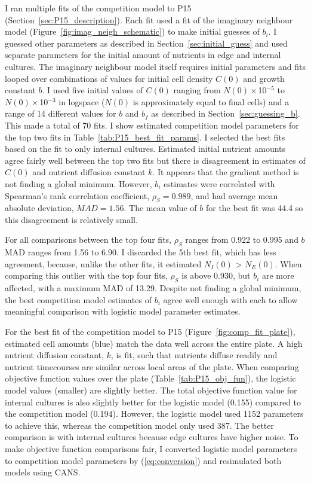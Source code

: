 I ran multiple fits of the competition model to P15
(Section~\ref{sec:P15_description}). Each fit used a fit of the
imaginary neighbour model (Figure~\ref{fig:imag_neigh_schematic}) to
make initial guesses of \(b_{i}\). I guessed other parameters as
described in Section~\ref{sec:initial_guess} and used separate
parameters for the initial amount of nutrients in edge and internal
cultures. The imaginary neighbour model itself requires initial
parameters and fits looped over combinations of values for initial
cell density \(C(0)\) and growth constant \(b\). I used five initial
values of \(C(0)\) ranging from \(N(0)\times\)10\(^{-5}\) to
\(N(0)\times\)10\(^{-3}\) in logspace (\(N(0)\) is approximately equal
to final cells) and a range of 14 different values for \(b\) and
\(b_{f}\) as described in Section~\ref{sec:guessing_b}. This made a
total of 70 fits. I show estimated competition model parameters for
the top two fits in Table~\ref{tab:P15_best_fit_params}. I selected
the best fits based on the fit to only internal cultures. Estimated
initial nutrient amounts agree fairly well between the top two fits
but there is disagreement in estimates of \(C(0)\) and nutrient
diffusion constant \(k\). It appears that the gradient method is not
finding a global minimum. However, \(b_{i}\) estimates were correlated
with Spearman's rank correlation coefficient, \(\rho_{S} = 0.989\),
and had average mean absolute deviation, \(MAD = 1.56\). The mean
value of \(b\) for the best fit was 44.4 so this disagreement is
relatively small.

For all comparisons between the top four fits, \(\rho_{S}\) ranges
from 0.922 to 0.995 and \(b\) MAD ranges from 1.56 to 6.90. I
discarded the 5th best fit, which has less agreement, because, unlike
the other fits, it estimated \(N_{I}(0)\) > \(N_{E}(0)\). When
comparing this outlier with the top four fits, \(\rho_{S}\) is above
0.930, but \(b_{i}\) are more affected, with a maximum MAD of
13.29. Despite not finding a global minimum, the best competition
model estimates of \(b_{i}\) agree well enough with each to allow
meaningful comparison with logistic model parameter estimates.

For the best fit of the competition model to P15
(Figure~\ref{fig:comp_fit_plate}), estimated cell amounts (blue) match
the data well across the entire plate. A high nutrient diffusion
constant, \(k\), is fit, such that nutrients diffuse readily and
nutrient timecourses are similar across local areas of the plate. When
comparing objective function values over the plate
(Table~\ref{tab:P15_obj_fun}), the logistic model values (smaller) are
slightly better. The total objective function value for internal
cultures is also slightly better for the logistic model (0.155)
compared to the competition model (0.194). However, the logistic model
used 1152 parameters to achieve this, whereas the competition model
only used 387. The better comparison is with internal cultures because
edge cultures have higher noise. To make objective function
comparisons fair, I converted logistic model parameters to competition
model parameters by (\ref{eq:conversion}) and resimulated both models
using CANS.

